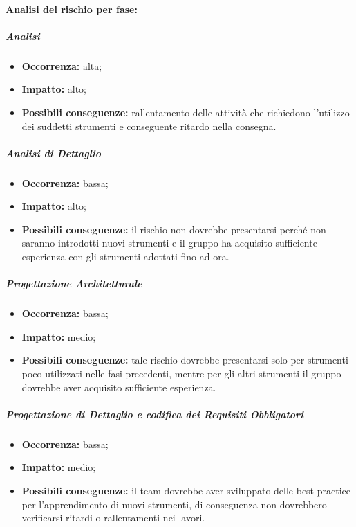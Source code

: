 \documentclass[../PianoProgetto.tex]{subfiles}
\begin{document}
	\paragraph*{Analisi del rischio per fase:} 
	
		\subparagraph*{Analisi}
			\begin{itemize}[label={-}]
				\item \textbf{Occorrenza:} alta;
				\item \textbf{Impatto:} alto;
				\item \textbf{Possibili conseguenze:} rallentamento delle attività che richiedono l'utilizzo dei suddetti strumenti e conseguente ritardo nella consegna.
			\end{itemize}
			
		\subparagraph*{Analisi di Dettaglio}
			\begin{itemize}[label={-}]
				\item \textbf{Occorrenza:} bassa;
				\item \textbf{Impatto:} alto;
				\item \textbf{Possibili conseguenze:} il rischio non dovrebbe presentarsi perché non saranno introdotti nuovi strumenti e il gruppo ha acquisito sufficiente esperienza con gli strumenti adottati fino ad ora.
			\end{itemize}
			
		\subparagraph*{Progettazione Architetturale}
			\begin{itemize}[label={-}]
				\item \textbf{Occorrenza:} bassa;
				\item \textbf{Impatto:} medio;
				\item \textbf{Possibili conseguenze:} tale rischio dovrebbe presentarsi solo per strumenti poco utilizzati nelle fasi precedenti, mentre per gli altri strumenti il gruppo dovrebbe aver acquisito sufficiente esperienza.
			\end{itemize}
			
		\subparagraph*{Progettazione di Dettaglio e codifica dei Requisiti Obbligatori}
			\begin{itemize}[label={-}]
				\item \textbf{Occorrenza:} bassa;
				\item \textbf{Impatto:} medio;
				\item \textbf{Possibili conseguenze:} il team dovrebbe aver sviluppato delle best practice per l'apprendimento di nuovi strumenti, di conseguenza non dovrebbero verificarsi ritardi o rallentamenti nei lavori.
			\end{itemize}
			
\end{document}
